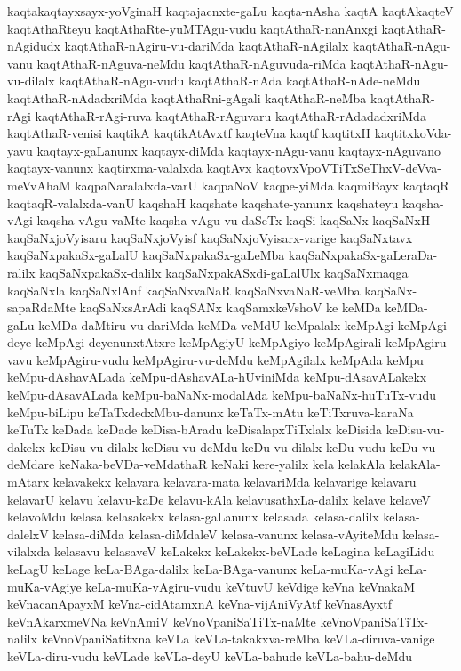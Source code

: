 {kaqtakaqtayxsayx-yoVginaH
kaqtajacnxte-gaLu
kaqta-nAsha
kaqtA
kaqtAkaqteV
kaqtAthaRteyu
kaqtAthaRte-yuMTAgu-vudu
kaqtAthaR-nanAnxgi
kaqtAthaR-nAgidudx
kaqtAthaR-nAgiru-vu-dariMda
kaqtAthaR-nAgilalx
kaqtAthaR-nAgu-vanu
kaqtAthaR-nAguva-neMdu
kaqtAthaR-nAguvuda-riMda
kaqtAthaR-nAgu-vu-dilalx
kaqtAthaR-nAgu-vudu
kaqtAthaR-nAda
kaqtAthaR-nAde-neMdu
kaqtAthaR-nAdadxriMda
kaqtAthaRni-gAgali
kaqtAthaR-neMba
kaqtAthaR-rAgi
kaqtAthaR-rAgi-ruva
kaqtAthaR-rAguvaru
kaqtAthaR-rAdadadxriMda
kaqtAthaR-venisi
kaqtikA
kaqtikAtAvxtf
kaqteVna
kaqtf
kaqtitxH
kaqtitxkoVda-yavu
kaqtayx-gaLanunx
kaqtayx-diMda
kaqtayx-nAgu-vanu
kaqtayx-nAguvano
kaqtayx-vanunx
kaqtirxma-valalxda
kaqtAvx
kaqtovxVpoVTiTxSeThxV-deVva-meVvAhaM
kaqpaNaralalxda-varU
kaqpaNoV
kaqpe-yiMda
kaqmiBayx
kaqtaqR
kaqtaqR-valalxda-vanU
kaqshaH
kaqshate
kaqshate-yanunx
kaqshateyu
kaqsha-vAgi
kaqsha-vAgu-vaMte
kaqsha-vAgu-vu-daSeTx
kaqSi
kaqSaNx
kaqSaNxH
kaqSaNxjoVyisaru
kaqSaNxjoVyisf
kaqSaNxjoVyisarx-varige
kaqSaNxtavx
kaqSaNxpakaSx-gaLalU
kaqSaNxpakaSx-gaLeMba
kaqSaNxpakaSx-gaLeraDa-ralilx
kaqSaNxpakaSx-dalilx
kaqSaNxpakASxdi-gaLalUlx
kaqSaNxmaqga
kaqSaNxla
kaqSaNxlAnf
kaqSaNxvaNaR
kaqSaNxvaNaR-veMba
kaqSaNx-sapaRdaMte
kaqSaNxsArAdi
kaqSANx
kaqSamxkeVshoV
ke
keMDa
keMDa-gaLu
keMDa-daMtiru-vu-dariMda
keMDa-veMdU
keMpalalx
keMpAgi
keMpAgi-deye
keMpAgi-deyenunxtAtxre
keMpAgiyU
keMpAgiyo
keMpAgirali
keMpAgiru-vavu
keMpAgiru-vudu
keMpAgiru-vu-deMdu
keMpAgilalx
keMpAda
keMpu
keMpu-dAshavALada
keMpu-dAshavALa-hUviniMda
keMpu-dAsavALakekx
keMpu-dAsavALada
keMpu-baNaNx-modalAda
keMpu-baNaNx-huTuTx-vudu
keMpu-biLipu
keTaTxdedxMbu-danunx
keTaTx-mAtu
keTiTxruva-karaNa
keTuTx
keDada
keDade
keDisa-bAradu
keDisalapxTiTxlalx
keDisida
keDisu-vu-dakekx
keDisu-vu-dilalx
keDisu-vu-deMdu
keDu-vu-dilalx
keDu-vudu
keDu-vu-deMdare
keNaka-beVDa-veMdathaR
keNaki
kere-yalilx
kela
kelakAla
kelakAla-mAtarx
kelavakekx
kelavara
kelavara-mata
kelavariMda
kelavarige
kelavaru
kelavarU
kelavu
kelavu-kaDe
kelavu-kAla
kelavusathxLa-dalilx
kelave
kelaveV
kelavoMdu
kelasa
kelasakekx
kelasa-gaLanunx
kelasada
kelasa-dalilx
kelasa-dalelxV
kelasa-diMda
kelasa-diMdaleV
kelasa-vanunx
kelasa-vAyiteMdu
kelasa-vilalxda
kelasavu
kelasaveV
keLakekx
keLakekx-beVLade
keLagina
keLagiLidu
keLagU
keLage
keLa-BAga-dalilx
keLa-BAga-vanunx
keLa-muKa-vAgi
keLa-muKa-vAgiye
keLa-muKa-vAgiru-vudu
keVtuvU
keVdige
keVna
keVnakaM
keVnacanApayxM
keVna-cidAtamxnA
keVna-vijAniVyAtf
keVnasAyxtf
keVnAkarxmeVNa
keVnAmiV
keVnoVpaniSaTiTx-naMte
keVnoVpaniSaTiTx-nalilx
keVnoVpaniSatitxna
keVLa
keVLa-takakxva-reMba
keVLa-diruva-vanige
keVLa-diru-vudu
keVLade
keVLa-deyU
keVLa-bahude
keVLa-bahu-deMdu
}
